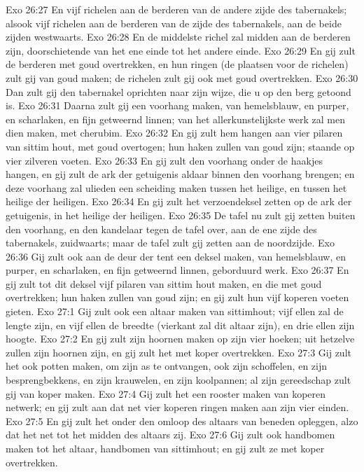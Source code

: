 Exo 26:27  En vijf richelen aan de berderen van de andere zijde des tabernakels; alsook vijf richelen aan de berderen van de zijde des tabernakels, aan de beide zijden westwaarts.
Exo 26:28  En de middelste richel zal midden aan de berderen zijn, doorschietende van het ene einde tot het andere einde.
Exo 26:29  En gij zult de berderen met goud overtrekken, en hun ringen (de plaatsen voor de richelen) zult gij van goud maken; de richelen zult gij ook met goud overtrekken.
Exo 26:30  Dan zult gij den tabernakel oprichten naar zijn wijze, die u op den berg getoond is.
Exo 26:31  Daarna zult gij een voorhang maken, van hemelsblauw, en purper, en scharlaken, en fijn getweernd linnen; van het allerkunstelijkste werk zal men dien maken, met cherubim.
Exo 26:32  En gij zult hem hangen aan vier pilaren van sittim hout, met goud overtogen; hun haken zullen van goud zijn; staande op vier zilveren voeten.
Exo 26:33  En gij zult den voorhang onder de haakjes hangen, en gij zult de ark der getuigenis aldaar binnen den voorhang brengen; en deze voorhang zal ulieden een scheiding maken tussen het heilige, en tussen het heilige der heiligen.
Exo 26:34  En gij zult het verzoendeksel zetten op de ark der getuigenis, in het heilige der heiligen.
Exo 26:35  De tafel nu zult gij zetten buiten den voorhang, en den kandelaar tegen de tafel over, aan de ene zijde des tabernakels, zuidwaarts; maar de tafel zult gij zetten aan de noordzijde.
Exo 26:36  Gij zult ook aan de deur der tent een deksel maken, van hemelsblauw, en purper, en scharlaken, en fijn getweernd linnen, geborduurd werk.
Exo 26:37  En gij zult tot dit deksel vijf pilaren van sittim hout maken, en die met goud overtrekken; hun haken zullen van goud zijn; en gij zult hun vijf koperen voeten gieten.
Exo 27:1  Gij zult ook een altaar maken van sittimhout; vijf ellen zal de lengte zijn, en vijf ellen de breedte (vierkant zal dit altaar zijn), en drie ellen zijn hoogte.
Exo 27:2  En gij zult zijn hoornen maken op zijn vier hoeken; uit hetzelve zullen zijn hoornen zijn, en gij zult het met koper overtrekken.
Exo 27:3  Gij zult het ook potten maken, om zijn as te ontvangen, ook zijn schoffelen, en zijn besprengbekkens, en zijn krauwelen, en zijn koolpannen; al zijn gereedschap zult gij van koper maken.
Exo 27:4  Gij zult het een rooster maken van koperen netwerk; en gij zult aan dat net vier koperen ringen maken aan zijn vier einden.
Exo 27:5  En gij zult het onder den omloop des altaars van beneden opleggen, alzo dat het net tot het midden des altaars zij.
Exo 27:6  Gij zult ook handbomen maken tot het altaar, handbomen van sittimhout; en gij zult ze met koper overtrekken.

